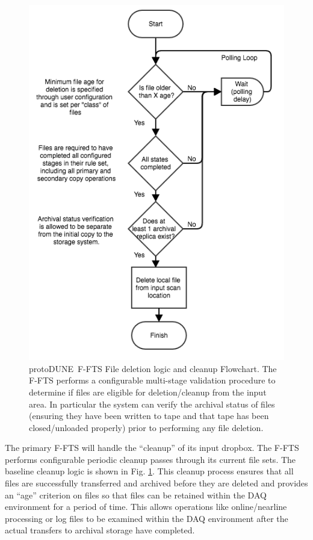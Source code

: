\documentclass[pdftex,12pt,letter]{article}
\newcommand{\pd}{protoDUNE\ }
\begin{document}
\begin{figure}[tbh]
\centering\includegraphics[width=0.5\linewidth]{fts_file_deletion_flowchart.png}
\caption{\label{fig:ftscleanup}\pd F-FTS File deletion logic and cleanup Flowchart.  The F-FTS performs a configurable multi-stage validation procedure to determine if files are eligible for deletion/cleanup from the input area.  In particular the system can verify the archival status of files (ensuring they have been written to tape and that tape has been closed/unloaded properly) prior to performing any file deletion. }
\end{figure}
The primary F-FTS will handle the “cleanup” of its input dropbox.  The F-FTS performs configurable periodic cleanup passes through its current file sets.  The baseline cleanup logic is shown in Fig. 
\ref{fig:ftscleanup}. 
This cleanup process ensures that all files are successfully transferred and archived before they are deleted and provides an “age” criterion on files so that files can be retained within the DAQ environment for a period of time.  This allows operations like online/nearline processing or log files to be examined within the DAQ environment after the actual transfers to archival storage have completed.
\end{document}
